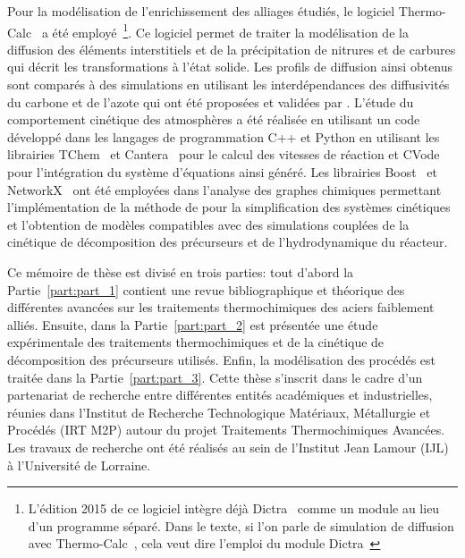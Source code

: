 Pour la modélisation de l'enrichissement des alliages étudiés, le logiciel Thermo-Calc~\cite{Andersson2002,Borgenstam2000} a été employé~\footnote{L'édition 2015 de ce logiciel intègre déjà Dictra~\cite{Borgenstam2000} comme un module au lieu d'un programme séparé. Dans le texte, si l'on parle de simulation de diffusion avec Thermo-Calc~\cite{Andersson2002,Borgenstam2000}, cela veut dire l'emploi du module Dictra~\cite{Borgenstam2000}}. Ce logiciel permet de traiter la modélisation de la diffusion des éléments interstitiels et de la précipitation de nitrures et de carbures qui décrit les transformations à l'état solide. Les profils de diffusion ainsi obtenus sont comparés à des simulations en utilisant les interdépendances des diffusivités du carbone et de l'azote qui ont été proposées et validées par \citet{Slycke1981ii}. L'étude du comportement cinétique des atmosphères a été réalisée en utilisant un code développé dans les langages de programmation C++ et Python en utilisant les librairies TChem~\cite{Tchem2011} et Cantera~\cite{Cantera2014} pour le calcul des vitesses de réaction et CVode~\cite{Hindmarsh2005} pour l'intégration du système d'équations ainsi généré. Les librairies Boost~\cite{BoostGraph2001} et NetworkX~\cite{Networkx2016} ont été employées dans l'analyse des graphes chimiques permettant l'implémentation de la méthode de \citet{Lu2006i} pour la simplification des systèmes cinétiques et l'obtention de modèles compatibles avec des simulations couplées de la cinétique de décomposition des précurseurs et de l'hydrodynamique du réacteur.

Ce mémoire de thèse est divisé en trois parties: tout d'abord la Partie~\ref{part:part_1} contient une revue bibliographique et théorique des différentes avancées sur les traitements thermochimiques des aciers faiblement alliés. Ensuite, dans la Partie~\ref{part:part_2} est présentée une étude expérimentale des traitements thermochimiques et de la cinétique de décomposition des précurseurs utilisés. Enfin, la modélisation des procédés est traitée dans la Partie~\ref{part:part_3}. Cette thèse s'inscrit dans le cadre d'un partenariat de recherche entre différentes entités académiques et industrielles, réunies dans l'Institut de Recherche Technologique Matériaux, Métallurgie et Procédés (IRT M2P) autour du projet Traitements Thermochimiques Avancées. Les travaux de recherche ont été réalisés au sein de l'Institut Jean Lamour (IJL) à l'Université de Lorraine.

\endinput